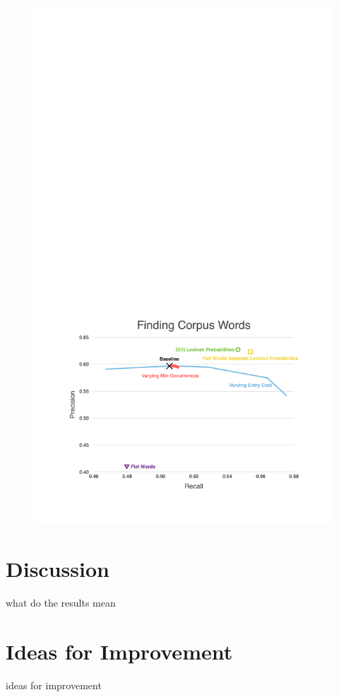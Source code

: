 \documentclass[11pt, oneside, fleqn]{article}
\begin{document}
  \begin{figure}[h]
  \includegraphics{./figure/finding_corpus_word.pdf}
  \end{figure}

  \section*{Discussion}

  what do the results mean

  \section*{Ideas for Improvement}

  ideas for improvement
\end{document}
